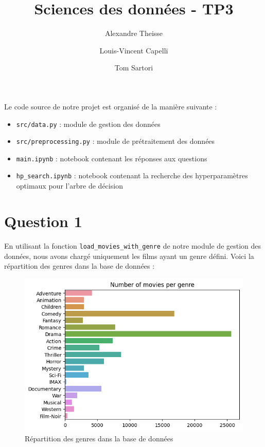 \documentclass{article}
\title{Sciences des données - TP3}
\author{Alexandre Theisse \and Louis-Vincent Capelli \and Tom Sartori}
\begin{document}
\maketitle
\newpage

\tableofcontents
\newpage

\noindent Le code source de notre projet est organisé de la manière suivante :
\begin{itemize}
  \item \texttt{src/data.py} : module de gestion des données
  \item \texttt{src/preprocessing.py} : module de prétraitement des données
  \item \texttt{main.ipynb} : notebook contenant les réponses aux questions
  \item \texttt{hp\_search.ipynb} : notebook contenant la recherche des
    hyperparamètres optimaux pour l'arbre de décision
\end{itemize}

\section{Question 1}
En utilisant la fonction \texttt{load\_movies\_with\_genre} de notre module
de gestion des données, nous avons chargé uniquement les films ayant un genre
défini.
\vskip 0.25cm
Voici la répartition des genres dans la base de données :

\begin{figure}[ht]
  \centering
  \includegraphics[width=1\textwidth]{img/genre_distribution.png}
  \caption{Répartition des genres dans la base de données}
\end{figure}
\end{document}

